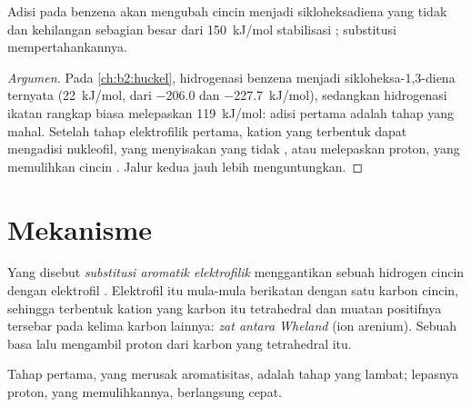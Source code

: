 \begin{proposition}\label{prop:b2:aromatic-substitution:no-addition}
Adisi pada benzena akan mengubah cincin  menjadi sikloheksadiena
yang tidak  dan kehilangan sebagian besar dari \qty{150}{kJ/mol}
stabilisasi ; substitusi mempertahankannya.
\end{proposition}

\begin{proof}[Argumen]
Pada \cref{ch:b2:huckel}, hidrogenasi benzena menjadi sikloheksa-1,3-diena
ternyata  (\qty{+22}{kJ/mol}, dari \qty{-206.0}{} dan
\qty{-227.7}{kJ/mol}), sedangkan hidrogenasi ikatan rangkap biasa melepaskan
\qty{119}{kJ/mol}: adisi pertama adalah tahap yang mahal.
Setelah tahap elektrofilik pertama, kation yang terbentuk dapat mengadisi
nukleofil, yang menyisakan  yang tidak , atau melepaskan
proton, yang memulihkan cincin . Jalur kedua jauh lebih
menguntungkan.
\end{proof}

\section{Mekanisme}

\begin{definition}\label{def:b2:aromatic-substitution:seAr}
Yang disebut \emph{substitusi aromatik elektrofilik}
menggantikan sebuah hidrogen cincin  dengan elektrofil .
Elektrofil itu mula-mula berikatan dengan satu karbon cincin, sehingga
terbentuk kation yang karbon itu tetrahedral dan muatan positifnya tersebar
pada kelima karbon lainnya: \emph{zat antara Wheland}
(ion arenium). Sebuah basa lalu mengambil proton dari karbon yang tetrahedral itu.
\end{definition}

\begin{proposition}\label{prop:b2:aromatic-substitution:mechanism}
Tahap pertama, yang merusak aromatisitas, adalah tahap yang lambat;
lepasnya proton, yang memulihkannya, berlangsung cepat.
\end{proposition}

